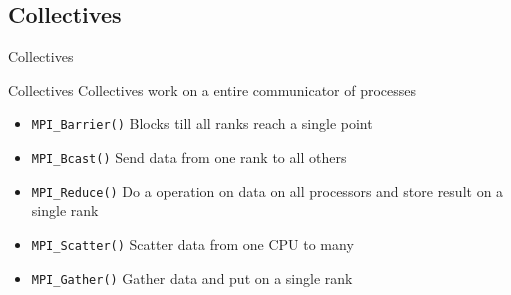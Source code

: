 \documentclass[handout]{beamer}
\begin{document}
\subsection{Collectives}
\begin{frame}{Collectives}
\begin{block}{Collectives}
 Collectives work on a entire communicator of processes
 \begin{itemize}
  \item <2->\texttt{MPI\_Barrier()} Blocks till all ranks reach a single point
  \item <2->\texttt{MPI\_Bcast()} Send data from one rank to all others
  \item <3->\texttt{MPI\_Reduce()} Do a operation on data on all processors and store result on a single rank
  \item <4->\texttt{MPI\_Scatter()} Scatter data from one CPU to many
  \item <5->\texttt{MPI\_Gather()} Gather data and put on a single rank
 \end{itemize}
\end{block}
\end{frame}
\end{document}
